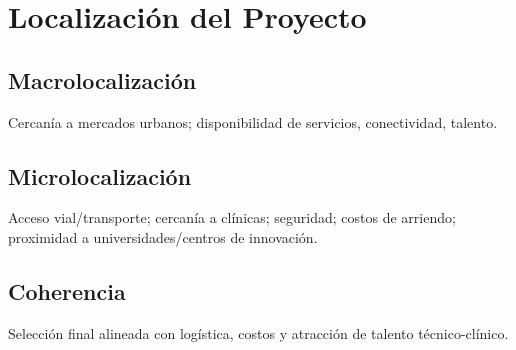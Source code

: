 \section{Localización del Proyecto}
\subsection{Macrolocalización}
Cercanía a mercados urbanos; disponibilidad de servicios, conectividad, talento.

\subsection{Microlocalización}
Acceso vial/transporte; cercanía a clínicas; seguridad; costos de arriendo; proximidad a universidades/centros de innovación.

\subsection{Coherencia}
Selección final alineada con logística, costos y atracción de talento técnico-clínico.
